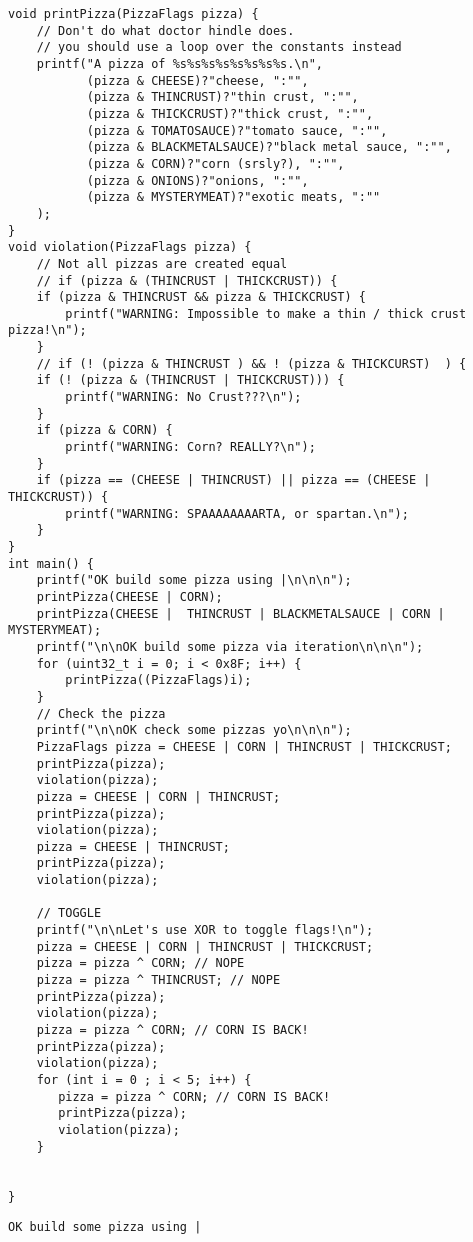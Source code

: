 \documentclass[11pt]{article}
\begin{document}
\begin{enumerate}
\begin{verbatim}
void printPizza(PizzaFlags pizza) {
    // Don't do what doctor hindle does.
    // you should use a loop over the constants instead
    printf("A pizza of %s%s%s%s%s%s%s%s.\n",
           (pizza & CHEESE)?"cheese, ":"",
           (pizza & THINCRUST)?"thin crust, ":"",
           (pizza & THICKCRUST)?"thick crust, ":"",
           (pizza & TOMATOSAUCE)?"tomato sauce, ":"",
           (pizza & BLACKMETALSAUCE)?"black metal sauce, ":"",
           (pizza & CORN)?"corn (srsly?), ":"",
           (pizza & ONIONS)?"onions, ":"",
           (pizza & MYSTERYMEAT)?"exotic meats, ":""
    );
}
void violation(PizzaFlags pizza) {
    // Not all pizzas are created equal
    // if (pizza & (THINCRUST | THICKCRUST)) {
    if (pizza & THINCRUST && pizza & THICKCRUST) {
        printf("WARNING: Impossible to make a thin / thick crust pizza!\n");
    }
    // if (! (pizza & THINCRUST ) && ! (pizza & THICKCURST)  ) {
    if (! (pizza & (THINCRUST | THICKCRUST))) {
        printf("WARNING: No Crust???\n");
    }
    if (pizza & CORN) {
        printf("WARNING: Corn? REALLY?\n");
    }
    if (pizza == (CHEESE | THINCRUST) || pizza == (CHEESE | THICKCRUST)) {
        printf("WARNING: SPAAAAAAAARTA, or spartan.\n");
    }
}
int main() {
    printf("OK build some pizza using |\n\n\n");
    printPizza(CHEESE | CORN);
    printPizza(CHEESE |  THINCRUST | BLACKMETALSAUCE | CORN | MYSTERYMEAT);
    printf("\n\nOK build some pizza via iteration\n\n\n");
    for (uint32_t i = 0; i < 0x8F; i++) {
        printPizza((PizzaFlags)i);
    }
    // Check the pizza
    printf("\n\nOK check some pizzas yo\n\n\n");
    PizzaFlags pizza = CHEESE | CORN | THINCRUST | THICKCRUST;
    printPizza(pizza);
    violation(pizza);
    pizza = CHEESE | CORN | THINCRUST;
    printPizza(pizza);
    violation(pizza);
    pizza = CHEESE | THINCRUST;
    printPizza(pizza);
    violation(pizza);

    // TOGGLE
    printf("\n\nLet's use XOR to toggle flags!\n");
    pizza = CHEESE | CORN | THINCRUST | THICKCRUST;
    pizza = pizza ^ CORN; // NOPE
    pizza = pizza ^ THINCRUST; // NOPE
    printPizza(pizza);
    violation(pizza);
    pizza = pizza ^ CORN; // CORN IS BACK!
    printPizza(pizza);
    violation(pizza);
    for (int i = 0 ; i < 5; i++) {
       pizza = pizza ^ CORN; // CORN IS BACK!
       printPizza(pizza);
       violation(pizza);
    }


}

\end{verbatim}

\begin{verbatim}
OK build some pizza using |



\end{verbatim}
\end{enumerate}
\end{document}
